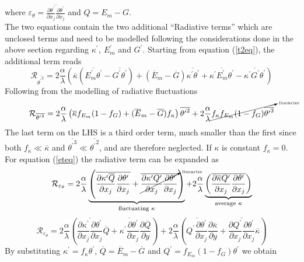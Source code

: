 \documentclass[10pt]{article}
\def\lp{\left(}
\def\rp{\right)}
\def\tp{\overline{{\theta^\prime}^2}}
\def\tr{{\theta^\prime}}
\def\et{{\varepsilon_{\theta}}}
\begin{document}
where $\et = \overline{\frac{\partial \tr}{\partial x_j}\frac{\partial \tr}{\partial x_j}}$ and $Q = E_m - G$. \\
The two equations contain the two additional \enquote{Radiative terms} which are unclosed terms and need to be modelled following the considerations done in the above section regarding $\kappa^\prime, \ E_m^\prime$ and $G^\prime$. Starting from equation (\ref{t2eq}), the additional term reads
\begin{equation*}
\mathcal{R}_{\tp} = 2\frac{\alpha}{\lambda} \lp \overline{\kappa} (\overline{E_m^\prime \tr}-\overline{G^\prime \tr}) + (\overline{E}_m - \overline{G})\overline{\kappa^\prime \tr}  + \overline{\kappa^\prime E_m^\prime \tr} - \overline{\kappa^\prime G^\prime \tr} \rp
\end{equation*}
Following from the modelling of radiative fluctuations
\begin{equation*}
\mathcal{R}_{\tp} = 2\frac{\alpha}{\lambda} \lp \overline{\kappa} f_{E_m}(1 - f_G ) + (\overline{E}_m - \overline{G})f_{\kappa} \rp \tp +2\frac{\alpha}{\lambda}\cancelto{\text{\tiny{linearize}}}{f_{\kappa}f_{E_m}(1-f_G) \overline{\tr^3}}
\end{equation*}
The last term on the LHS is a third order term, much smaller than the first since both $f_{\kappa} \ll \overline{\kappa}$ and $\overline{\tr^3} \ll \tp$, and are therefore neglected. If $\kappa$ is constant $f_{\kappa} = 0$.\\
For equation (\ref{eteq}) the radiative term can be expanded as
\begin{equation*}
\mathcal{R}_{\et} = 2\frac{\alpha}{\lambda} \underbrace{ \lp \overline{\frac{\partial \kappa^\prime \overline{Q}}{\partial x_j}\frac{\partial \tr}{\partial x_j}}+\cancelto{\text{\tiny{linearize}}}{\overline{\frac{\partial \kappa^\prime Q^\prime}{\partial x_j}\frac{\partial \tr}{\partial x_j}}}\rp}_{\text{fluctuating }\kappa } + 2\frac{\alpha}{\lambda} \underbrace{ \lp \overline{\frac{\partial \overline{\kappa} Q^\prime}{\partial x_j}\frac{\partial \tr}{\partial x_j}} \rp}_{\text{average } \kappa }  
\end{equation*}
\begin{equation*}
\mathcal{R}_{\et} = 2\frac{\alpha}{\lambda} \lp \overline{\frac{\partial \kappa^\prime}{\partial x_j}\frac{\partial \tr}{\partial x_j}}\overline{Q} +\overline{\kappa^\prime\frac{\partial \tr}{\partial x_j}} \frac{\partial \overline{Q}}{\partial y}\rp + 2\frac{\alpha}{\lambda} \lp \overline{ Q^\prime\frac{\partial \tr}{\partial x_j}}\frac{\partial \overline{\kappa}}{\partial y}  +
 \overline{\frac{\partial Q^\prime}{\partial x_j}\frac{\partial \tr}{\partial x_j}}\overline{\kappa} \rp  
\end{equation*}
By substituting $\kappa^\prime = f_{\kappa} \tr$, $\overline{Q} = \overline{E}_m - \overline{G}$ and $Q^\prime = f_{E_m}(1-f_G) \tr$ we obtain
\end{document}
